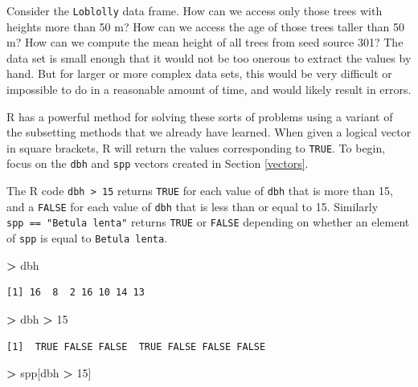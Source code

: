 \documentclass[]{krantz}
\makeatletter
\newenvironment{Shaded}{\begin{snugshade}}{\end{snugshade}}
\newcommand{\DecValTok}[1]{\textcolor[rgb]{0.06,0.06,0.06}{#1}}
\newcommand{\NormalTok}[1]{#1}
\newcommand{\OperatorTok}[1]{\textcolor[rgb]{0.43,0.43,0.43}{\textbf{#1}}}
\newcommand{\StringTok}[1]{\textcolor[rgb]{0.5,0.5,0.5}{#1}}
\newenvironment{kframe}{%
\medskip{}
\setlength{\fboxsep}{.8em}
 \def\at@end@of@kframe{}%
 \ifinner\ifhmode%
  \def\at@end@of@kframe{\end{minipage}}%
  \begin{minipage}{\columnwidth}%
 \fi\fi%
 \def\FrameCommand##1{\hskip\@totalleftmargin \hskip-\fboxsep
 \colorbox{shadecolor}{##1}\hskip-\fboxsep
     \hskip-\linewidth \hskip-\@totalleftmargin \hskip\columnwidth}%
 \MakeFramed {\advance\hsize-\width
   \@totalleftmargin\z@ \linewidth\hsize
   \@setminipage}}%
 {\par\unskip\endMakeFramed%
 \at@end@of@kframe}
\renewenvironment{Shaded}{\begin{kframe}}{\end{kframe}}
\makeatother
\begin{document}
Consider the \texttt{Loblolly} data frame. How can we access only those trees with heights more than 50 m? How can we access the age of those trees taller than 50 m? How can we compute the mean height of all trees from seed source 301? The data set is small enough that it would not be too onerous to extract the values by hand. But for larger or more complex data sets, this would be very difficult or impossible to do in a reasonable amount of time, and would likely result in errors.

R has a powerful method for solving these sorts of problems using a variant of the subsetting methods that we already have learned. When given a logical vector in square brackets, R will return the values corresponding to \texttt{TRUE}. To begin, focus on the \texttt{dbh} and \texttt{spp} vectors created in Section \ref{vectors}.

The R code \texttt{dbh\ \textgreater{}\ 15} returns \texttt{TRUE} for each value of \texttt{dbh} that is more than 15, and a \texttt{FALSE} for each value of \texttt{dbh} that is less than or equal to 15. Similarly \texttt{spp\ ==\ "Betula\ lenta"} returns \texttt{TRUE} or \texttt{FALSE} depending on whether an element of \texttt{spp} is equal to \texttt{Betula\ lenta}.

\begin{Shaded}
\begin{Highlighting}[]
\OperatorTok{>}\StringTok{ }\NormalTok{dbh}
\end{Highlighting}
\end{Shaded}

\begin{verbatim}
[1] 16  8  2 16 10 14 13
\end{verbatim}

\begin{Shaded}
\begin{Highlighting}[]
\OperatorTok{>}\StringTok{ }\NormalTok{dbh }\OperatorTok{>}\StringTok{ }\DecValTok{15}
\end{Highlighting}
\end{Shaded}

\begin{verbatim}
[1]  TRUE FALSE FALSE  TRUE FALSE FALSE FALSE
\end{verbatim}

\begin{Shaded}
\begin{Highlighting}[]
\OperatorTok{>}\StringTok{ }\NormalTok{spp[dbh }\OperatorTok{>}\StringTok{ }\DecValTok{15}\NormalTok{]}
\end{Highlighting}
\end{Shaded}
\end{document}
